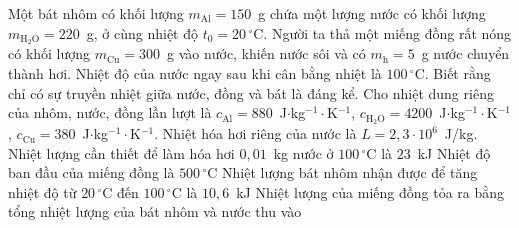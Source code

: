 	\begin{ex}%
		Một bát nhôm có khối lượng $m_{\text{Al}}=150$~g chứa một lượng nước có khối lượng $m_{\text{H}_2\text{O}}=220$~g, ở cùng nhiệt độ $t_0=20\,^\circ\text{C}$. Người ta thả một miếng đồng rất nóng có khối lượng $m_{\text{Cu}}=300$~g vào nước, khiến nước sôi và có $m_\text{h}=5$~g nước chuyển thành hơi. Nhiệt độ của nước ngay sau khi cân bằng nhiệt là $100\,^\circ\text{C}$. Biết rằng chỉ có sự truyền nhiệt giữa nước, đồng và bát là đáng kể. Cho nhiệt dung riêng của nhôm, nước, đồng lần lượt là $c_{\text{Al}}=880$~J$\cdot$kg$^{-1}\cdot$K$^{-1}$, $c_{\text{H}_2\text{O}}=4200$~J$\cdot$kg$^{-1}\cdot$K$^{-1}$, $c_{\text{Cu}}=380$~J$\cdot$kg$^{-1}\cdot$K$^{-1}$. Nhiệt hóa hơi riêng của nước là $L=2{,}3\cdot 10^6$~J/kg.
		\choiceTFt
		{\True Nhiệt lượng cần thiết để làm hóa hơi $0{,}01$~kg nước ở $100\,^\circ\text{C}$ là $23$~kJ}
		{Nhiệt độ ban đầu của miếng đồng là $500\,^\circ\text{C}$}
		{\True Nhiệt lượng bát nhôm nhận được để tăng nhiệt độ từ $20\,^\circ\text{C}$ đến $100\,^\circ\text{C}$ là $10{,}6$~kJ}
		{\True Nhiệt lượng của miếng đồng tỏa ra bằng tổng nhiệt lượng của bát nhôm và nước thu vào}
	\end{ex}

